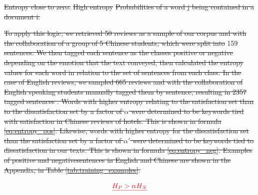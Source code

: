 \documentclass[review]{elsarticle}
\providecommand{\DIFadd}[1]{{\protect\color{blue}\uwave{#1}}} %
\providecommand{\DIFdel}[1]{{\protect\color{red}\sout{#1}}}                      %
\providecommand{\DIFaddbegin}{} %
\providecommand{\DIFaddend}{} %
\providecommand{\DIFdelbegin}{} %
\providecommand{\DIFdelend}{} %
\providecommand{\DIFdelFL}[1]{\DIFdel{#1}} %
\newcommand{\DIFscaledelfig}{0.5}
\newlength{\DIFdelgraphicswidth} %
\newlength{\DIFdelgraphicsheight} %
\newcommand{\DIFaddincludegraphics}[2][]{{\color{blue}\fbox{\DIFOincludegraphics[#1]{#2}}}} %
\newcommand{\DIFdelincludegraphics}[2][]{%
\sbox{\DIFdelgraphicsbox}{\DIFOincludegraphics[#1]{#2}}%
\settoboxwidth{\DIFdelgraphicswidth}{\DIFdelgraphicsbox} %
\settoboxtotalheight{\DIFdelgraphicsheight}{\DIFdelgraphicsbox} %
\scalebox{\DIFscaledelfig}{%
\parbox[b]{\DIFdelgraphicswidth}{\usebox{\DIFdelgraphicsbox}\\[-\baselineskip] \rule{\DIFdelgraphicswidth}{0em}}\llap{\resizebox{\DIFdelgraphicswidth}{\DIFdelgraphicsheight}{%
\setlength{\unitlength}{\DIFdelgraphicswidth}%
\begin{picture}(1,1)%
\thicklines\linethickness{2pt} %
{\color[rgb]{1,0,0}\put(0,0){\framebox(1,1){}}}%
{\color[rgb]{1,0,0}\put(0,0){\line( 1,1){1}}}%
{\color[rgb]{1,0,0}\put(0,1){\line(1,-1){1}}}%
\end{picture}%
}\hspace*{3pt}}} %
} %
\DeclareRobustCommand{\DIFaddbegin}{\DIFOaddbegin \let\includegraphics\DIFaddincludegraphics} %
\DeclareRobustCommand{\DIFaddend}{\DIFOaddend \let\includegraphics\DIFOincludegraphics} %
\DeclareRobustCommand{\DIFdelbegin}{\DIFOdelbegin \let\includegraphics\DIFdelincludegraphics} %
\DeclareRobustCommand{\DIFdelend}{\DIFOaddend \let\includegraphics\DIFOincludegraphics} %
\begin{document}
{%
\DIFdelFL{Entropy close to zero.}}
{%
\DIFdelFL{High entropy}}
{%
\DIFdelFL{Probabilities of a word j being contained in a document i.}}

\DIFdel{To apply this logic, we retrieved 50 reviews as a sample of our corpus and with the collaboration of a group of 5 Chinese students, which were split into }\DIFdelend \DIFaddbegin \DIFadd{We tagged }\DIFaddend 159 \DIFdelbegin \DIFdel{sentences. We then tagged each sentence as the classes positive or negative depending on the emotion that the text conveyed, then calculated the entropy values for each word in relation to the set of sentences from each class. In the case of English reviews, we sampled 665 reviews and with the collaboration of English speaking students manually tagged them by sentence, resulting in \num[group-separator={,}]{2357} tagged sentences . Words with higher entropy relating to the satisfaction set than to the dissatisfaction set by a factor of \(\alpha\) were determined to be keywords tied with satisfaction in Chinese reviews of hotels. This is shown in formula \ref{eq:entropy_pos}. Likewise, words with higher entropy for the dissatisfaction set than the satisfaction set by a factor of \(\alpha'\) were determined to be keywords tied to dissatisfaction in our texts. This is shown in formula \ref{eq:entropy_neg}. Examples of positive and negativesentences in English and Chinese are shown in the Appendix, in Table \ref{tab:training_examples}. }%

\begin{displaymath}\DIFdel{\label{eq:entropy_pos}
H_{P} > \alpha H_{N} %
}\end{displaymath}
\end{document}
